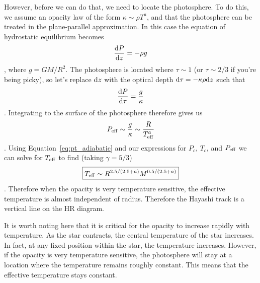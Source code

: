 However, before we can do that, we need to locate the photosphere.  To do this, we
assume an opacity law of the form $\kappa \sim \rho T^a$, and that the photosphere
can be treated in the plane-parallel approximation.
In this case the equation of hydrostatic equilibrium becomes
\begin{dmath*}
\frac{\d P}{\d z} = -\rho g
\end{dmath*},
where $g = GM/R^2$.  The photosphere is located where $\tau\sim 1$ (or $\tau\sim 2/3$ if
you're being picky), so let's replace ${\rm d} z$ with the optical depth ${\rm d}\tau = -\kappa\rho{\rm d} z$
such that
\begin{dmath*}
\frac{\d P}{\d\tau} = \frac{g}{\kappa}
\end{dmath*}.
Integrating to the surface of the photosphere therefore gives us
\begin{dmath}
    P_{\rm eff} \sim \frac{g}{\kappa} \nolinebreak
                \sim \frac{R}{T_{\rm eff}^a}
\end{dmath}.
Using Equation~\ref{eq:pt_adiabatic} and our expressions for $P_c$, $T_c$, and $P_{\rm eff}$
we can solve for $T_{\rm eff}$ to find (taking $\gamma=5/3$)
\begin{dmath}\boxed{
    T_{\rm eff} \sim R^{2.5/(2.5+a)}M^{0.5/(2.5+a)}
}\end{dmath}.
Therefore when the opacity is very temperature sensitive, the effective temperature is almost independent of radius.  Therefore the Hayashi
track is a vertical line on the HR diagram.

It is worth noting here that it is critical for the opacity to increase rapidly with temperature.
As the star contracts, the central temperature of the star increases.  In fact, at any fixed
position within the star, the temperature increases.  However, if the opacity is very temperature
sensitive, the photosphere will stay at a location where the temperature remains roughly
constant.  This means that the effective temperature stays constant.


